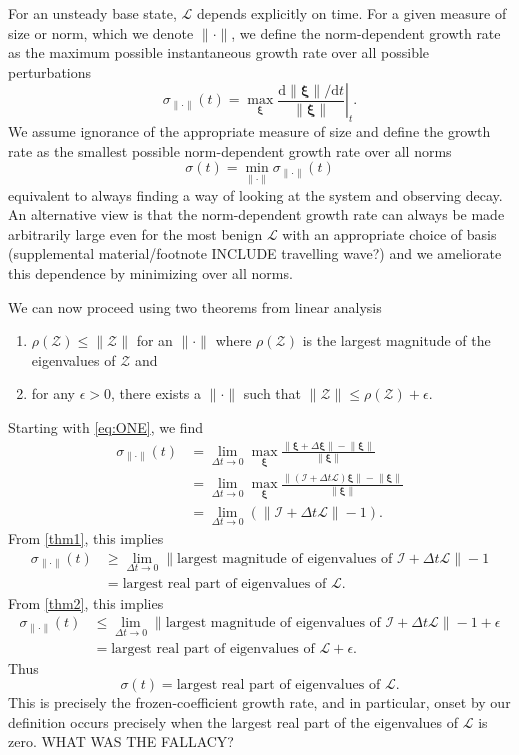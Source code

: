 \documentclass[letterpaper,prl,aps,preprint,superscriptaddress]{revtex4-1}
\newcommand{\cL}{\boldsymbol{\mathcal{L}}}
\newcommand{\cZ}{\boldsymbol{\mathcal{Z}}}
\newcommand{\cI}{\boldsymbol{\mathcal{I}}}
\newcommand{\prt}{\boldsymbol{\xi}}
\newcommand{\norm}[1]{{\|#1\|}}
\begin{document}
For an unsteady base state, $\cL$ depends explicitly on time.  For a given measure of size or norm, which we denote $\norm{\cdot}$, we define the norm-dependent growth rate as the maximum possible instantaneous growth rate over all possible perturbations
\begin{equation} \label{eq:ONE}
\sigma_\norm{\cdot} (t) = \max_{\prt} \left. \frac{\text{d} \norm{\prt}/\text{d} t}{\norm{\prt}}\right|_t.
\end{equation}
We assume ignorance of the appropriate measure of size and define the growth rate as the smallest possible norm-dependent growth rate over all norms
\[
\sigma(t) = \min_\norm{\cdot} \sigma_\norm{\cdot}(t)
\]
equivalent to always finding a way of looking at the system and observing decay.  An alternative view is that the norm-dependent growth rate can always be made arbitrarily large even for the most benign $\cL$ with an appropriate choice of basis (supplemental material/footnote INCLUDE travelling wave?) and we ameliorate this dependence by minimizing over all norms.

We can now proceed using two theorems from linear analysis \cite{BS}
\begin{enumerate}
\item $\rho(\cZ) \le \norm{\cZ}$ for an $\norm{\cdot}$ where $\rho(\cZ)$ is the largest magnitude of the eigenvalues of $\cZ$ and \label{thm1}
\item for any $\epsilon>0$, there exists a $\norm{\cdot}$ such that $\norm{\cZ} \le \rho(\cZ) + \epsilon$. \label{thm2}
\end{enumerate}
Starting with \eqref{eq:ONE}, we find
\begin{align*}
\sigma_\norm{\cdot}(t) &= \lim_{\Delta t \to 0} \max_{\prt} \frac{\norm{\prt + \Delta \prt} - \norm{\prt}}{\norm{\prt}} \\
&= \lim_{\Delta t \to 0} \max_{\prt} \frac{\norm{(\cI + \Delta t \cL)\prt} - \norm{\prt}}{\norm{\prt}} \\
&= \lim_{\Delta t \to 0} \left( \norm{\cI + \Delta t \cL} - 1 \right).
\end{align*}
From \eqref{thm1}, this implies
\begin{align*}
\sigma_\norm{\cdot}(t) &\ge \lim_{\Delta t \to 0} \| \text{largest magnitude of eigenvalues of } \cI + \Delta t \cL\| - 1 \\
&= \text{largest real part of eigenvalues of } \cL.
\end{align*}
From \eqref{thm2}, this implies
\begin{align*}
\sigma_\norm{\cdot}(t) &\le \lim_{\Delta t \to 0} \| \text{largest magnitude of eigenvalues of } \cI + \Delta t \cL\| - 1 + \epsilon \\
&= \text{largest real part of eigenvalues of } \cL + \epsilon .
\end{align*}
Thus 
\[
\sigma(t) = \text{largest real part of eigenvalues of } \cL.
\]
This is precisely the frozen-coefficient growth rate, and in particular, onset by our definition occurs precisely when the largest real part of the eigenvalues of $\cL$ is zero.  WHAT WAS THE FALLACY?
\end{document}
